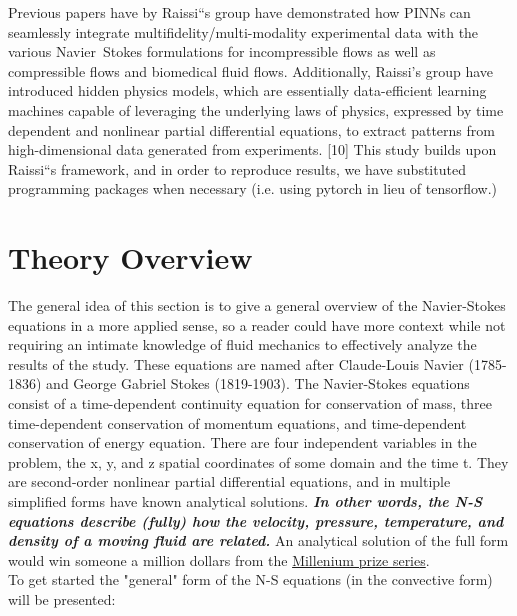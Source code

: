 \documentclass{article}
\begin{document}
Previous papers have by Raissi``s group have demonstrated how PINNs can
seamlessly integrate multifidelity/multi-modality experimental data with the
various Navier~Stokes formulations for incompressible flows
\cite{DBLP:journals/corr/abs-1711-10561,DBLP:journals/corr/abs-1711-10566} as
well as compressible flows \cite{physics-informed-machine-learning} and
biomedical fluid flows. Additionally, Raissi’s group have introduced hidden
physics models, which are essentially data-efficient learning machines capable
of leveraging the underlying laws of physics, expressed by time dependent and
nonlinear partial differential equations, to extract patterns from
high-dimensional data generated from experiments. [10]
This study builds upon Raissi``s framework, and in order to reproduce
results, we have substituted programming packages when necessary (i.e. using
pytorch in lieu of tensorflow.)

\section{Theory Overview} \label{theory}

The general idea of this section is to give a general overview of the
Navier-Stokes equations in a more applied sense, so a reader could have more
context while not requiring an intimate knowledge of fluid mechanics to
effectively analyze the results of the study. These equations are named after
Claude-Louis Navier (1785-1836) and George Gabriel Stokes (1819-1903). The
Navier-Stokes equations consist of a time-dependent continuity equation for
conservation of mass, three time-dependent conservation of momentum equations,
and time-dependent conservation of energy equation. There are four independent
variables in the problem, the x, y, and z spatial coordinates of some domain
and the time t.\cite{NASA} They are second-order nonlinear partial differential
equations, and in multiple simplified forms have known analytical solutions.
\textit{\textbf{In other words, the N-S equations describe (fully) how the
		velocity, pressure, temperature, and density of a moving fluid are related.}}
An analytical solution of the full form would win someone a million dollars
from the
\href{https://www.claymath.org/millennium-problems/navier%E2%80%93stokes-equationURL}{Millenium prize series}. \\


\noindent To get started the "general" form of the N-S equations (in
the convective form) will be presented:
\end{document}
